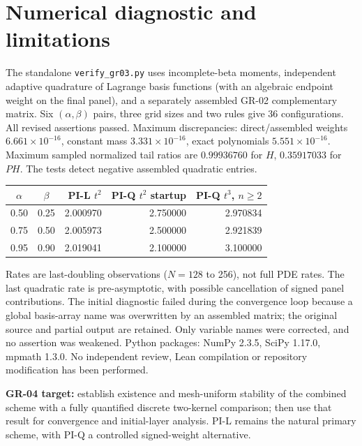 \documentclass[11pt,a4paper]{article}
\begin{document}
\section{Numerical diagnostic and limitations}
The standalone \texttt{verify\_gr03.py} uses incomplete-beta moments, independent adaptive quadrature of Lagrange basis functions (with an algebraic endpoint weight on the final panel), and a separately assembled GR-02 complementary matrix. Six $(\alpha,\beta)$ pairs, three grid sizes and two rules give 36 configurations. All revised assertions passed. Maximum discrepancies: direct/assembled weights $6.661\times10^{-16}$, constant mass $3.331\times10^{-16}$, exact polynomials $5.551\times10^{-16}$. Maximum sampled normalized tail ratios are $0.99936760$ for $H$, $0.35917033$ for $PH$. The tests detect negative assembled quadratic entries.
\begin{center}\small
\begin{tabular}{ccrrr}
\toprule
$\alpha$ & $\beta$ & PI-L $t^2$ & PI-Q $t^2$ startup & PI-Q $t^3$, $n\ge2$\\\midrule
0.50&0.25&2.000970&2.750000&2.970834\\
0.75&0.50&2.005973&2.500000&2.921839\\
0.95&0.90&2.019041&2.100000&3.100000\\\bottomrule
\end{tabular}
\end{center}
Rates are last-doubling observations ($N=128$ to 256), not full PDE rates. The last quadratic rate is pre-asymptotic, with possible cancellation of signed panel contributions. The initial diagnostic failed during the convergence loop because a global basis-array name was overwritten by an assembled matrix; the original source and partial output are retained. Only variable names were corrected, and no assertion was weakened. Python packages: NumPy 2.3.5, SciPy 1.17.0, mpmath 1.3.0. No independent review, Lean compilation or repository modification has been performed.

\textbf{GR-04 target:} establish existence and mesh-uniform stability of the combined scheme with a fully quantified discrete two-kernel comparison; then use that result for convergence and initial-layer analysis. PI-L remains the natural primary scheme, with PI-Q a controlled signed-weight alternative.
\end{document}
